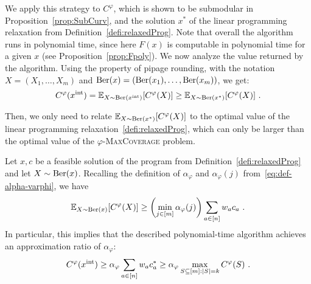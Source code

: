 We apply this strategy to $C^{\varphi}$, which is shown to be submodular in Proposition~\ref{prop:SubCurv}, and the solution $x^*$ of the linear programming relaxation from Definition~\ref{defi:relaxedProg}. Note that overall the algorithm runs in polynomial time, since here $F(x)$ is computable in polynomial time for a given $x$ (see Proposition~\ref{prop:Fpoly}). We now analyze the value returned by the algorithm. Using the property of pipage rounding, with the notation $X = (X_1,\ldots,X_m)$ and $\operatorname{\text{Ber}}(x) = (\operatorname{\text{Ber}}(x_1),\ldots,\operatorname{\text{Ber}}(x_m))$, we get:
\[ C^{\varphi}(x^{\text{int}}) = \mathbb{E}_{X \sim \operatorname{\text{Ber}}(x^{\text{int}})}[C^{\varphi}(X)] \geq \mathbb{E}_{X \sim \operatorname{\text{Ber}}(x^*)}[C^{\varphi}(X)] \ . \]

Then, we only need to relate $\mathbb{E}_{X \sim \operatorname{\text{Ber}}(x^*)}[C^{\varphi}(X)]$ to the optimal value of the linear programming relaxation~\ref{defi:relaxedProg}, which can only be larger than the optimal value of the $\varphi$-\textsc{MaxCoverage} problem. 


\begin{theorem}
  Let $x,c$ be a feasible solution of the program from Definition~\ref{defi:relaxedProg} and let $X \sim \operatorname{\text{Ber}}(x)$. Recalling the definition of $\alpha_{\varphi}$ and $\alpha_{\varphi}(j)$ from~\eqref{eq:def-alpha-varphi}, we have
  \[\mathbb{E}_{X \sim \operatorname{\text{Ber}}(x)}[C^{\varphi}(X)] \geq \left(\min_{j \in [m]} \alpha_{\varphi}(j)\right) \sum_{a \in [n]} w_ac_a\ .\]
  In particular, this implies that the described polynomial-time algorithm achieves an approximation ratio of $\alpha_{\varphi}$:
  \[C^{\varphi}(x^{\text{int}}) \geq \alpha_{\varphi} \sum_{a \in [n]} w_ac^*_a \geq \alpha_{\varphi} \max_{S \subseteq [m] : \abs{S} = k} C^{\varphi}(S)\ .\]
  \label{theo:AlgoCard}
\end{theorem}

